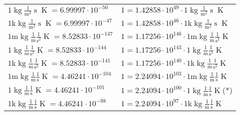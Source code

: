 \begin{center}
\begin{longtable}{l l}
{\color{black}$1 \bm{\mathrm{ }}\operatorname{kg}\frac1{\operatorname{m}^2}{\operatorname{s}}{}{\operatorname{K}} = 6.99997\cdot10^{-50} $}   & {\color{black}$ 1 = 1.42858\cdot10^{49} \cdot 1 \bm{\mathrm{ }}\operatorname{kg}\frac1{\operatorname{m}^2}{\operatorname{s}}{}{\operatorname{K}}$}  \\
{\color{gray}$1 \bm{\mathrm{ k}}\operatorname{kg}\frac1{\operatorname{m}^2}{\operatorname{s}}{}{\operatorname{K}} = 6.99997\cdot10^{-47} $}   & {\color{gray}$ 1 = 1.42858\cdot10^{46} \cdot 1 \bm{\mathrm{ k}}\operatorname{kg}\frac1{\operatorname{m}^2}{\operatorname{s}}{}{\operatorname{K}}$}  \\
{\color{gray}$1 \bm{\mathrm{ m}}\operatorname{kg}\frac1{\operatorname{m}}\frac1{\operatorname{s}^2}{}{\operatorname{K}} = 8.52833\cdot10^{-147} $}   & {\color{gray}$ 1 = 1.17256\cdot10^{146} \cdot 1 \bm{\mathrm{ m}}\operatorname{kg}\frac1{\operatorname{m}}\frac1{\operatorname{s}^2}{}{\operatorname{K}}$}  \\
{\color{black}$1 \bm{\mathrm{ }}\operatorname{kg}\frac1{\operatorname{m}}\frac1{\operatorname{s}^2}{}{\operatorname{K}} = 8.52833\cdot10^{-144} $}   & {\color{black}$ 1 = 1.17256\cdot10^{143} \cdot 1 \bm{\mathrm{ }}\operatorname{kg}\frac1{\operatorname{m}}\frac1{\operatorname{s}^2}{}{\operatorname{K}}$}  \\
{\color{gray}$1 \bm{\mathrm{ k}}\operatorname{kg}\frac1{\operatorname{m}}\frac1{\operatorname{s}^2}{}{\operatorname{K}} = 8.52833\cdot10^{-141} $}   & {\color{gray}$ 1 = 1.17256\cdot10^{140} \cdot 1 \bm{\mathrm{ k}}\operatorname{kg}\frac1{\operatorname{m}}\frac1{\operatorname{s}^2}{}{\operatorname{K}}$}  \\
{\color{gray}$1 \bm{\mathrm{ m}}\operatorname{kg}\frac1{\operatorname{m}}\frac1{\operatorname{s}}{}{\operatorname{K}} = 4.46241\cdot10^{-104} $}   & {\color{gray}$ 1 = 2.24094\cdot10^{103} \cdot 1 \bm{\mathrm{ m}}\operatorname{kg}\frac1{\operatorname{m}}\frac1{\operatorname{s}}{}{\operatorname{K}}$}  \\
{\color{black}$1 \bm{\mathrm{ }}\operatorname{kg}\frac1{\operatorname{m}}\frac1{\operatorname{s}}{}{\operatorname{K}} = 4.46241\cdot10^{-101} $}   & {\color{black}$ 1 = 2.24094\cdot10^{100} \cdot 1 \bm{\mathrm{ }}\operatorname{kg}\frac1{\operatorname{m}}\frac1{\operatorname{s}}{}{\operatorname{K}}$}\quad(*)\\
{\color{gray}$1 \bm{\mathrm{ k}}\operatorname{kg}\frac1{\operatorname{m}}\frac1{\operatorname{s}}{}{\operatorname{K}} = 4.46241\cdot10^{-98} $}   & {\color{gray}$ 1 = 2.24094\cdot10^{97} \cdot 1 \bm{\mathrm{ k}}\operatorname{kg}\frac1{\operatorname{m}}\frac1{\operatorname{s}}{}{\operatorname{K}}$}  \\

\end{longtable}
\end{center}
